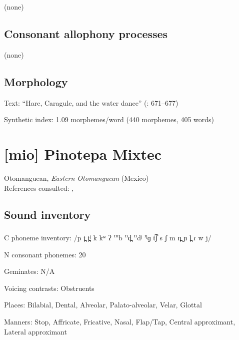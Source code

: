{(none)
\subsection*{Consonant allophony processes}

(none)

\subsection*{Morphology}

\begin{appendixdesc}

\item[Text:] “Hare, Caragule, and the water dance” (\citealt{BlackingsFabb2003}: 671--677)

\item[Synthetic index:] 1.09 morphemes/word (440 morphemes, 405 words)
\end{appendixdesc}
\section*{[mio] Pinotepa Mixtec}  %
Otomanguean, \textit{Eastern Otomanguean} (Mexico)\medskip\\
References consulted: \citet{Bradley1970}, \citet{Costello2014}
\subsection*{Sound inventory}
\begin{appendixdesc}

\item[C phoneme inventory:] /p t̪ t̪ʲ k kʷ ʔ \textsuperscript{m}b \textsuperscript{n}d̪ \textsuperscript{n}dʲ \textsuperscript{ŋ}ɡ t͡ʃ s ʃ m n̪ ɲ l̪ ɾ w j/

\item[N consonant phonemes:] 20

\item[Geminates:] N/A

\item[Voicing contrasts:] Obstruents

\item[Places:] Bilabial, Dental, Alveolar, Palato-alveolar, Velar, Glottal

\item[Manners:] Stop, Affricate, Fricative, Nasal, Flap/Tap, Central approximant, Lateral approximant


\end{appendixdesc}}

